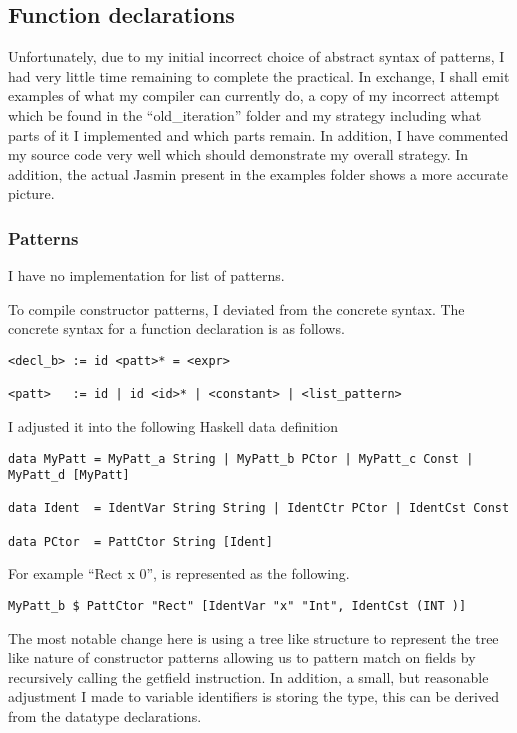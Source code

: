 \documentclass{article}
\begin{document}
\subsection{Function declarations}

Unfortunately, due to my initial incorrect choice of abstract syntax of patterns, I had very little time remaining to complete the practical. In exchange, I shall emit examples of what my compiler can currently do, a copy of my incorrect attempt which be found in the ``old\_iteration'' folder and my strategy including what parts of it I implemented and which parts remain. In addition, I have commented my source code very well which should demonstrate my overall strategy. In addition, the actual Jasmin present in the examples folder shows a more accurate picture.

\subsubsection{Patterns}

I have no implementation for list of patterns.

To compile constructor patterns, I deviated from the concrete syntax. The concrete syntax for a function declaration is as follows.

\begin{verbatim}
<decl_b> := id <patt>* = <expr>

<patt>   := id | id <id>* | <constant> | <list_pattern>

\end{verbatim}

I adjusted it into the following Haskell data definition

\begin{verbatim}
data MyPatt = MyPatt_a String | MyPatt_b PCtor | MyPatt_c Const | MyPatt_d [MyPatt]

data Ident  = IdentVar String String | IdentCtr PCtor | IdentCst Const

data PCtor  = PattCtor String [Ident]
\end{verbatim}

For example ``Rect x 0'', is represented as the following.

\begin{verbatim}
MyPatt_b $ PattCtor "Rect" [IdentVar "x" "Int", IdentCst (INT )]
\end{verbatim}

The most notable change here is using a tree like structure to represent the tree like nature of constructor patterns allowing us to pattern match on fields by recursively calling the getfield instruction. In addition, a small, but reasonable adjustment I made to variable identifiers is storing the type, this can be derived from the datatype declarations.
\end{document}
